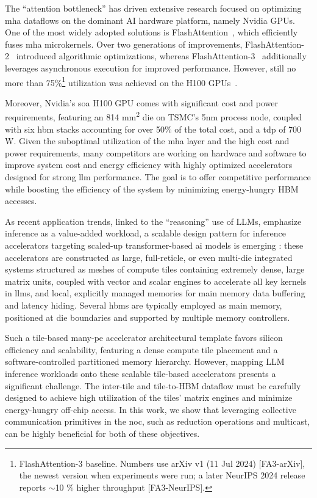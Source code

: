 \documentclass[conference]{IEEEtran}
\begin{document}
The ``attention bottleneck'' has driven extensive research focused on optimizing \gls{mha} dataflows on the dominant AI hardware platform, namely Nvidia GPUs.
One of the most widely adopted solutions is FlashAttention~\cite{dao2022}, which efficiently fuses \gls{mha} microkernels.
Over two generations of improvements, FlashAttention-2~\cite{dao2023} introduced algorithmic optimizations, whereas FlashAttention-3~\cite{shah2024} additionally leverages asynchronous execution for improved performance.
However, still no more than 75\%\footnote{FlashAttention-3 baseline. Numbers use arXiv v1 (11 Jul 2024) [FA3-arXiv], the newest version when experiments were run; a later NeurIPS 2024 release reports $\sim$10 \% higher throughput [FA3-NeurIPS].} utilization was achieved on the H100 GPUs~\cite{shah2024}.

Moreover, Nvidia’s \gls{soa} H100 GPU comes with significant cost and power requirements, featuring an 814 mm\textsuperscript{2} die on TSMC's 5nm process node, coupled with six \gls{hbm} stacks accounting for over 50\% of the total cost, and a \gls{tdp} of 700 W.
Given the suboptimal utilization of the \gls{mha} layer and the high cost and power requirements, many competitors are working on hardware and software to improve system cost and energy efficiency with highly optimized accelerators designed for strong \gls{llm} performance.
The goal is to offer competitive performance while boosting the efficiency of the system by minimizing energy-hungry HBM accesses.


As recent application trends, linked to the ``reasoning'' use of LLMs, emphasize inference as a value-added workload, a scalable design pattern for inference accelerators targeting scaled-up transformer-based \gls{ai} models is emerging \cite{prabhakar2024b, lie2024, vasiljevic2024, lee202516}: these accelerators are constructed as large, full-reticle, or even multi-die integrated systems \cite{lie2024} structured as meshes of compute tiles containing extremely dense, large matrix units, coupled with vector and scalar engines to accelerate all key kernels in \glspl{llm}, and local, explicitly managed memories for main memory data buffering and latency hiding.
Several \glspl{hbm} are typically employed as main memory, positioned at die boundaries and supported by multiple memory controllers.

Such a tile-based many-\gls{pe} accelerator architectural template favors silicon efficiency and scalability, featuring a dense compute tile placement and a software-controlled partitioned memory hierarchy.
However, mapping LLM inference workloads onto these scalable tile-based accelerators presents a significant challenge.
The inter-tile and tile-to-HBM dataflow must be carefully designed to achieve high utilization of the tiles' matrix engines and minimize energy-hungry off-chip access. In this work, we show that leveraging collective communication primitives in the \gls{noc}, such as reduction operations and multicast, can be highly beneficial for both of these objectives.
\end{document}
